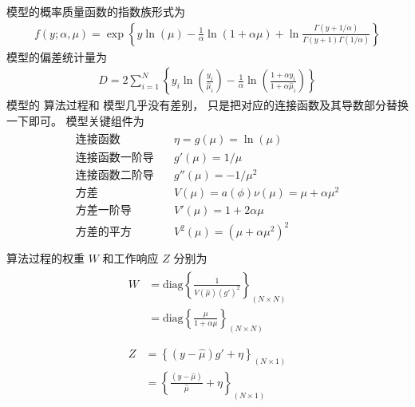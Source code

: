 \documentclass[letterpaper,10pt,english]{sphinxmanual}
\begin{document}
 模型的概率质量函数的指数族形式为
\begin{equation}\label{equation:负二项模型/content:eq_nb_51}
\begin{split}f(y;\alpha,\mu)
= \exp \left \{
y \ln  ( \mu  )- \frac{1}{\alpha} \ln (1+\alpha \mu) + \ln \frac{\Gamma(y+1/\alpha)  }{\Gamma(y+1) \Gamma(1/\alpha) }
\right \}\end{split}
\end{equation}
 模型的偏差统计量为
\begin{equation}\label{equation:负二项模型/content:负二项模型/content:20}
\begin{split}D = 2\sum_{i=1}^N \left \{
    y_i \ln \left ( \frac{y_i}{ \hat{\mu}_i} \right )
- \frac{1}{\alpha}  \ln \left (  \frac{1+\alpha y_i}{1+\alpha \hat{\mu}_i} \right )
\right \}\end{split}
\end{equation}
 模型的  算法过程和  模型几乎没有差别，
只是把对应的连接函数及其导数部分替换一下即可。
 模型关键组件为
\begin{align}\label{equation:负二项模型/content:负二项模型/content:21}\!\begin{aligned}
\text{连接函数} \quad  &\eta = g(\mu) = \ln (\mu)\\
\text{连接函数一阶导} \quad  &g'(\mu) = 1/\mu\\
\text{连接函数二阶导} \quad  &g''(\mu) = -1/\mu^2\\
\text{方差} \quad  &V(\mu) = a(\phi)\nu(\mu) = \mu+\alpha \mu^2\\
\text{方差一阶导} \quad  &V'(\mu) = 1+ 2\alpha \mu\\
\text{方差的平方} \quad  &V^2(\mu) = ( \mu+\alpha \mu^2)^2\\
\end{aligned}\end{align}
 算法过程的权重 \(W\) 和工作响应 \(Z\)
分别为
\begin{align}\label{equation:负二项模型/content:负二项模型/content:22}\!\begin{aligned}
W &= \text{diag} \left \{ \frac{ 1}{ V(\hat{\mu}) ( g' )^2}
\right \}_{(N\times N)}\\
&= \text{diag} \left \{
\frac{\mu}{1+\alpha \mu}
\right \}_{(N\times N)}\\
\end{aligned}\end{align}\begin{align}\label{equation:负二项模型/content:负二项模型/content:23}\!\begin{aligned}
Z &=   \left \{ (y- \hat{\mu}) g'  + \eta
\right \}_{(N\times 1 )}\\
&=   \left \{ \frac{(y- \hat{\mu})}{\hat{\mu}}  + \eta
\right \}_{(N\times 1 )}\\
\end{aligned}\end{align}
\end{document}
